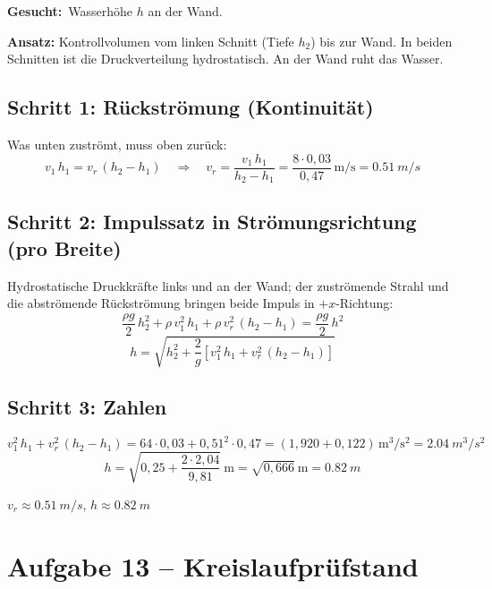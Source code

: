 \documentclass[11pt,a4paper]{article}
\newcommand{\gesucht}{\textbf{Gesucht:}\ }
\begin{document}
\gesucht Wasserhöhe $h$ an der Wand.

\textbf{Ansatz:} Kontrollvolumen vom linken Schnitt (Tiefe $h_2$) bis zur Wand. In beiden Schnitten ist die Druckverteilung hydrostatisch. An der Wand ruht das Wasser.

\subsection*{Schritt 1: Rückströmung (Kontinuität)}

Was unten zuströmt, muss oben zurück:
\[
v_1\,h_1 = v_r\,(h_2 - h_1)
\quad\Rightarrow\quad
v_r = \frac{v_1\,h_1}{h_2 - h_1} = \frac{8\cdot 0{,}03}{0{,}47}\,\mathrm{m/s} = \SI{0.51}{m/s}
\]

\subsection*{Schritt 2: Impulssatz in Strömungsrichtung (pro Breite)}

Hydrostatische Druckkräfte links und an der Wand; der zuströmende Strahl und die abströmende Rückströmung bringen beide Impuls in $+x$-Richtung:
\[
\frac{\rho g}{2}\,h_2^2 + \rho\,v_1^2\,h_1 + \rho\,v_r^2\,(h_2 - h_1) = \frac{\rho g}{2}\,h^2
\]
\[
h = \sqrt{h_2^2 + \frac{2}{g}\left[v_1^2\,h_1 + v_r^2\,(h_2 - h_1)\right]}
\]

\subsection*{Schritt 3: Zahlen}
\[
v_1^2\,h_1 + v_r^2\,(h_2 - h_1) = 64\cdot 0{,}03 + 0{,}51^2\cdot 0{,}47 = (1{,}920 + 0{,}122)\,\mathrm{m^3/s^2} = \SI{2.04}{m^3/s^2}
\]
\[
h = \sqrt{0{,}25 + \frac{2\cdot 2{,}04}{9{,}81}}\ \mathrm{m} = \sqrt{0{,}666}\ \mathrm{m} = \SI{0.82}{m}
\]

\begin{ergebnis}
$v_r \approx \SI{0.51}{m/s}$, \quad $h \approx \SI{0.82}{m}$
\end{ergebnis}

\section{Aufgabe 13 -- Kreislaufprüfstand}

\begin{bild}

\end{bild}
\end{document}
